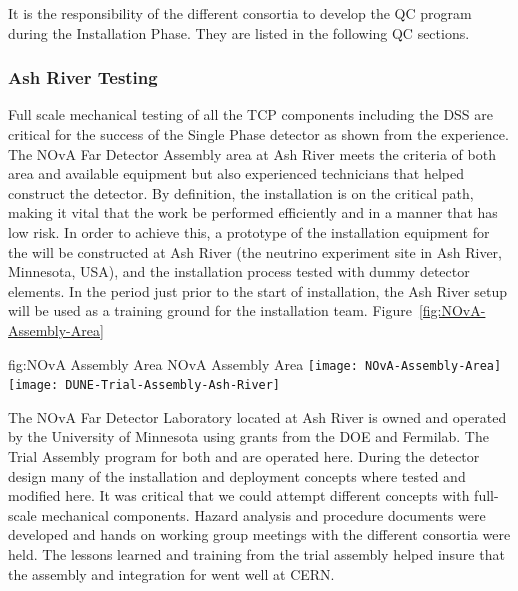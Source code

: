 It is the responsibility of the different consortia to develop the QC program during the Installation Phase. 
They are listed in the following QC sections. 

\subsubsection{Ash River Testing}

Full scale mechanical testing of all the TCP components including the DSS are critical for the success of the Single Phase detector as shown from the  experience. 
The NOvA Far Detector Assembly area at Ash River meets the criteria of both area and available equipment but also experienced technicians that helped construct the  detector. 
By definition, the installation  is on the critical path, making it vital that the work be performed efficiently and in a manner that has low risk. 
In order to achieve this, a prototype of the installation
equipment for the   will be constructed at Ash River (the \nova neutrino experiment  site in Ash River, Minnesota, USA), and the installation process tested with dummy detector
elements.  
In the period just prior to the start of
installation, the Ash River setup will be used as a training ground for the installation team.
Figure~\ref{fig:NOvA-Assembly-Area}
\begin{dunefigure}
{fig:NOvA Assembly Area}
{NOvA Assembly Area}                
\texttt{[image: NOvA-Assembly-Area]}
\texttt{[image: DUNE-Trial-Assembly-Ash-River]}
\end{dunefigure}




The NOvA Far Detector Laboratory located at Ash River is owned and operated by the University of Minnesota using grants from the DOE and Fermilab. The Trial Assembly program for both  and  are operated here. During the  detector design many of the installation and deployment concepts where tested and modified here.  It was critical that we could attempt different concepts with full-scale mechanical components. Hazard analysis and procedure documents were developed and hands on working group meetings with the different consortia were held.  The lessons learned and training from the trial assembly helped insure that the assembly and integration for  went well at CERN.

